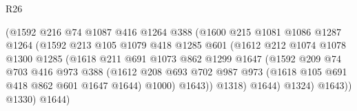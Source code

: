 \begin{lexlean}{R26}
\begin{coremodule}
                                  (@1592
                                    @216
                                    @74
                                    @1087
                                    @416
                                    @1264
                                    @388
                                    (@1600
                                      @215
                                      @1081
                                      @1086
                                      @1287
                                      @1264
                                      (@1592
                                        @213
                                        @105
                                        @1079
                                        @418
                                        @1285
                                        @601
                                        (@1612
                                          @212
                                          @1074
                                          @1078
                                          @1300
                                          @1285
                                          (@1618
                                            @211
                                            @691
                                            @1073
                                            @862
                                            @1299
                                            @1647
                                            (@1592
                                              @209
                                              @74
                                              @703
                                              @416
                                              @973
                                              @388
                                              (@1612
                                                @208
                                                @693
                                                @702
                                                @987
                                                @973
                                                (@1618 @105 @691 @418 @862 @601 @1647 @1644)
                                                @1000)
                                              @1643))
                                          @1318)
                                        @1644)
                                      @1324)
                                    @1643))
                                @1330)
                              @1644)

\end{coremodule}
\end{lexlean}
